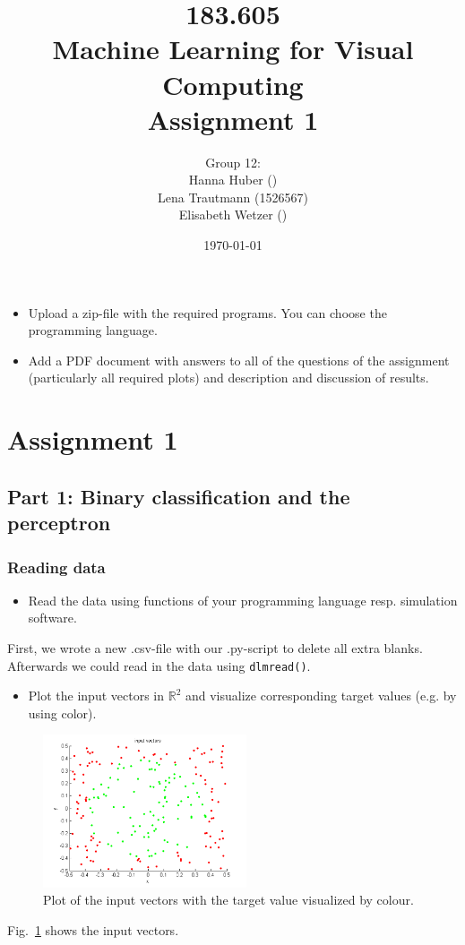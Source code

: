 \documentclass[a4]{article}
\title{\bf 183.605 \\ Machine Learning for Visual Computing \\ Assignment 1}
\author{Group 12: \\
	Hanna Huber () \\ Lena Trautmann (1526567) \\ Elisabeth Wetzer ()}
\date{\today}
\begin{document}
\maketitle
\noindent

\begin{itemize}
\item Upload a zip-file with the required programs. You can choose the programming language.
\item Add a PDF document with answers to all of the questions of the assignment (particularly all required plots) and description and discussion of results. 
\end{itemize}

\section{Assignment 1}


\subsection{Part 1: Binary classification and the perceptron}

\subsubsection{Reading data}\label{sec:readdata}
\begin{itemize}
\item Read the data using functions of your programming language resp. simulation software.
\end{itemize}
First, we wrote a new .csv-file with our .py-script to delete all extra blanks. Afterwards we could read in the data using \texttt{dlmread()}.

\begin{itemize}
\item Plot the input vectors in $\mathbb{R}^2$ and visualize corresponding target values (e.g. by using color). 
\end{itemize}
\begin{figure}[!h]
	\begin{center}
		\centering
		\includegraphics[width=6cm]{figures/inputVectors.pdf}
	\end{center}
	\label{fig:inputVectors}
	\caption{Plot of the input vectors with the target value visualized by colour.}
\end{figure}
Fig.~\ref{fig:inputVectors} shows the input vectors.
\end{document}
